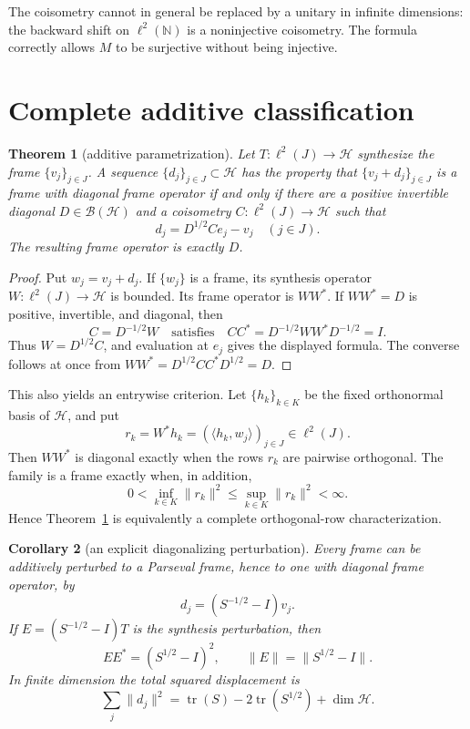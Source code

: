 \documentclass[11pt]{article}
\newtheorem{theorem}{Theorem}
\newtheorem{corollary}[theorem]{Corollary}
\newcommand{\HH}{\mathcal H}
\newcommand{\ellJ}{\ell^2(J)}
\begin{document}
The coisometry cannot in general be replaced by a unitary in infinite
dimensions: the backward shift on \(\ell^2(\mathbb N)\) is a noninjective
coisometry. The formula correctly allows \(M\) to be surjective without
being injective.

\section{Complete additive classification}

\begin{theorem}[additive parametrization]\label{thm:additive}
Let \(T:\ellJ\to\HH\) synthesize the frame \(\{v_j\}_{j\in J}\). A sequence
\(\{d_j\}_{j\in J}\subset\HH\) has the property that
\(\{v_j+d_j\}_{j\in J}\) is a frame with diagonal frame operator if and only
if there are a positive invertible diagonal \(D\in\mathcal B(\HH)\) and a
coisometry \(C:\ellJ\to\HH\) such that
\[
 \boxed{\quad d_j=D^{1/2}Ce_j-v_j\quad(j\in J).\quad}
\]
The resulting frame operator is exactly \(D\).
\end{theorem}

\begin{proof}
Put \(w_j=v_j+d_j\). If \(\{w_j\}\) is a frame, its synthesis operator
\(W:\ellJ\to\HH\) is bounded. Its frame operator is \(WW^*\). If \(WW^*=D\)
is positive, invertible, and diagonal, then
\[
 C=D^{-1/2}W
 \quad\text{satisfies}\quad
 CC^*=D^{-1/2}WW^*D^{-1/2}=I.
\]
Thus \(W=D^{1/2}C\), and evaluation at \(e_j\) gives the displayed formula.
The converse follows at once from
\(WW^*=D^{1/2}CC^*D^{1/2}=D\).
\end{proof}

This also yields an entrywise criterion. Let \(\{h_k\}_{k\in K}\) be the
fixed orthonormal basis of \(\HH\), and put
\[
 r_k=W^*h_k=(\langle h_k,w_j\rangle)_{j\in J}\in\ellJ.
\]
Then \(WW^*\) is diagonal exactly when the rows \(r_k\) are pairwise
orthogonal. The family is a frame exactly when, in addition,
\[
 0<\inf_{k\in K}\|r_k\|^2
 \le \sup_{k\in K}\|r_k\|^2<\infty.
\]
Hence Theorem~\ref{thm:additive} is equivalently a complete orthogonal-row
characterization.

\begin{corollary}[an explicit diagonalizing perturbation]\label{cor:tighten}
Every frame can be additively perturbed to a Parseval frame, hence to one
with diagonal frame operator, by
\[
 d_j=(S^{-1/2}-I)v_j.
\]
If \(E=(S^{-1/2}-I)T\) is the synthesis perturbation, then
\[
 EE^*=(S^{1/2}-I)^2,
 \qquad
 \|E\|=\|S^{1/2}-I\|.
\]
In finite dimension the total squared displacement is
\[
 \sum_j\|d_j\|^2
 =\operatorname{tr}(S)-2\operatorname{tr}(S^{1/2})+\dim\HH.
\]
\end{corollary}
\end{document}
